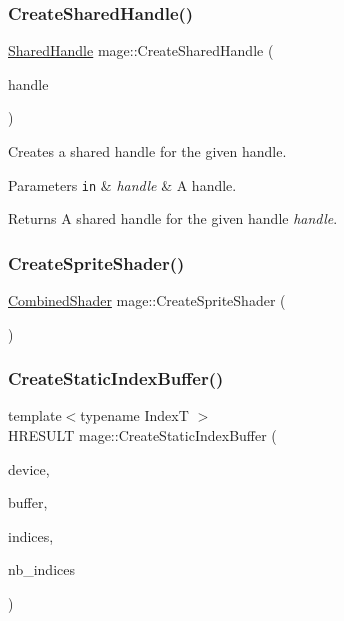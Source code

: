 \hypertarget{namespacemage_a3119898d7caac71d8ee495c3ae3194b1}{}\label{namespacemage_a3119898d7caac71d8ee495c3ae3194b1} 
\subsubsection{\texorpdfstring{Create\+Shared\+Handle()}{CreateSharedHandle()}}
{\footnotesize\ttfamily \hyperlink{namespacemage_ab892828913d6129acf71e0cec60467e5}{Shared\+Handle} mage\+::\+Create\+Shared\+Handle (\begin{DoxyParamCaption}\item[{H\+A\+N\+D\+LE}]{handle }\end{DoxyParamCaption})}

Creates a shared handle for the given handle.


\begin{DoxyParams}[1]{Parameters}
\mbox{\tt in}  & {\em handle} & A handle. \\
\hline
\end{DoxyParams}
\begin{DoxyReturn}{Returns}
A shared handle for the given handle {\itshape handle}. 
\end{DoxyReturn}
\hypertarget{namespacemage_af6f5c6ae46131caa77e5361d23d5d7c8}{}\label{namespacemage_af6f5c6ae46131caa77e5361d23d5d7c8} 
\subsubsection{\texorpdfstring{Create\+Sprite\+Shader()}{CreateSpriteShader()}}
{\footnotesize\ttfamily \hyperlink{structmage_1_1_combined_shader}{Combined\+Shader} mage\+::\+Create\+Sprite\+Shader (\begin{DoxyParamCaption}{ }\end{DoxyParamCaption})}

\hypertarget{namespacemage_a6d7b762686800ea46b6f56dbfa0727a2}{}\label{namespacemage_a6d7b762686800ea46b6f56dbfa0727a2} 
\subsubsection{\texorpdfstring{Create\+Static\+Index\+Buffer()}{CreateStaticIndexBuffer()}}
{\footnotesize\ttfamily template$<$typename IndexT $>$ \\
H\+R\+E\+S\+U\+LT mage\+::\+Create\+Static\+Index\+Buffer (\begin{DoxyParamCaption}\item[{I\+D3\+D11\+Device2 $\ast$}]{device,  }\item[{I\+D3\+D11\+Buffer $\ast$$\ast$}]{buffer,  }\item[{const IndexT $\ast$}]{indices,  }\item[{size\+\_\+t}]{nb\+\_\+indices }\end{DoxyParamCaption})}

